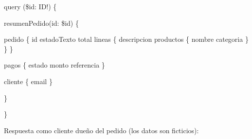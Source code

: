 \begin{codigo}
query (\allowbreak{}\$id:\allowbreak{} ID!) \{\par
\hspace*{2\ttw}resumenPedido(\allowbreak{}id:\allowbreak{} \$id) \{\par
\hspace*{4\ttw}pedido \{ id estadoTexto total lineas \{ descripcion productos \{ nombre categoria \} \} \}\par
\hspace*{4\ttw}pagos \{ estado monto referencia \}\par
\hspace*{4\ttw}cliente \{ email \}\par
\hspace*{2\ttw}\}\par
\}\par
\end{codigo}

Respuesta como cliente dueño del pedido (los datos son ficticios):


